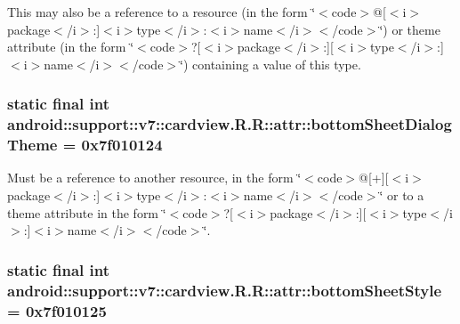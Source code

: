 This may also be a reference to a resource (in the form \char`\"{}$<$code$>$@\mbox{[}$<$i$>$package$<$/i$>$:\mbox{]}$<$i$>$type$<$/i$>$:$<$i$>$name$<$/i$>$$<$/code$>$\char`\"{}) or theme attribute (in the form \char`\"{}$<$code$>$?\mbox{[}$<$i$>$package$<$/i$>$:\mbox{]}\mbox{[}$<$i$>$type$<$/i$>$:\mbox{]}$<$i$>$name$<$/i$>$$<$/code$>$\char`\"{}) containing a value of this type. \hypertarget{classandroid_1_1support_1_1v7_1_1cardview_1_1_r_1_1attr_75f7d47de05632038daeb6c7e1b12e67}{
\subsubsection[{bottomSheetDialogTheme}]{\setlength{\rightskip}{0pt plus 5cm}static final int android::support::v7::cardview.R.R::attr::bottomSheetDialogTheme = 0x7f010124}}
\label{classandroid_1_1support_1_1v7_1_1cardview_1_1_r_1_1attr_75f7d47de05632038daeb6c7e1b12e67}


Must be a reference to another resource, in the form \char`\"{}$<$code$>$@\mbox{[}+\mbox{]}\mbox{[}$<$i$>$package$<$/i$>$:\mbox{]}$<$i$>$type$<$/i$>$:$<$i$>$name$<$/i$>$$<$/code$>$\char`\"{} or to a theme attribute in the form \char`\"{}$<$code$>$?\mbox{[}$<$i$>$package$<$/i$>$:\mbox{]}\mbox{[}$<$i$>$type$<$/i$>$:\mbox{]}$<$i$>$name$<$/i$>$$<$/code$>$\char`\"{}. \hypertarget{classandroid_1_1support_1_1v7_1_1cardview_1_1_r_1_1attr_0e0faec9256dcef639e479b2caf30233}{
\subsubsection[{bottomSheetStyle}]{\setlength{\rightskip}{0pt plus 5cm}static final int android::support::v7::cardview.R.R::attr::bottomSheetStyle = 0x7f010125}}
\label{classandroid_1_1support_1_1v7_1_1cardview_1_1_r_1_1attr_0e0faec9256dcef639e479b2caf30233}


